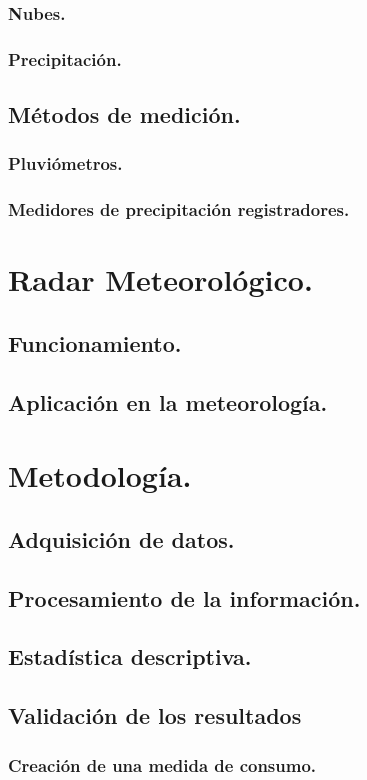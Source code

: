 \documentclass[letterpaper,12pt,oneside]{book}
\begin{document}
        \subsection{Nubes.}
        \subsection{Precipitación.}
    \section{Métodos de medición.}
        \subsection{Pluviómetros.}
        \subsection{Medidores de precipitación registradores.}
\chapter{Radar Meteorológico.}
    \section{Funcionamiento.}
    \section{Aplicación en la meteorología.}
\chapter{Metodología.}
    \section{Adquisición de datos.}
    \section{Procesamiento de la información.}
    \section{Estadística descriptiva.}
    \section{Validación de los resultados}
        \subsection{Creación de una medida de consumo.}
\end{document}
